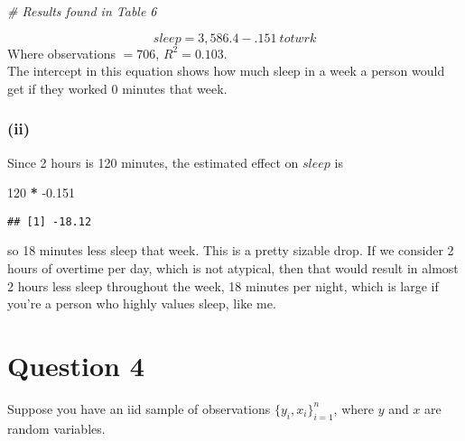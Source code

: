 \documentclass[
]{article}
\newenvironment{Shaded}{\begin{snugshade}}{\end{snugshade}}
\newcommand{\CommentTok}[1]{\textcolor[rgb]{0.56,0.35,0.01}{\textit{#1}}}
\newcommand{\DecValTok}[1]{\textcolor[rgb]{0.00,0.00,0.81}{#1}}
\newcommand{\FloatTok}[1]{\textcolor[rgb]{0.00,0.00,0.81}{#1}}
\newcommand{\OperatorTok}[1]{\textcolor[rgb]{0.81,0.36,0.00}{\textbf{#1}}}
\newcommand{\StringTok}[1]{\textcolor[rgb]{0.31,0.60,0.02}{#1}}
\begin{document}
\begin{Shaded}
\begin{Highlighting}[]
\CommentTok{# Results found in Table 6}
\end{Highlighting}
\end{Shaded}

\[ sleep = 3,586.4 - .151 \:totwrk\] Where observations \(= 706\),
\(R^2 = 0.103\).\\
The intercept in this equation shows how much sleep in a week a person
would get if they worked 0 minutes that week.

\hypertarget{ii-4}{%
\subsubsection{(ii)}\label{ii-4}}

Since 2 hours is 120 minutes, the estimated effect on \(sleep\) is

\begin{Shaded}
\begin{Highlighting}[]
\DecValTok{120} \OperatorTok{*}\StringTok{ }\FloatTok{-0.151}
\end{Highlighting}
\end{Shaded}

\begin{verbatim}
## [1] -18.12
\end{verbatim}

so 18 minutes less sleep that week. This is a pretty sizable drop. If we
consider 2 hours of overtime per day, which is not atypical, then that
would result in almost 2 hours less sleep throughout the week, 18
minutes per night, which is large if you're a person who highly values
sleep, like me.

\hypertarget{question-4}{%
\section{Question 4}\label{question-4}}

Suppose you have an iid sample of observations \(\{y_i, x_i\}^n_{i=1}\),
where \(y\) and \(x\) are random variables.
\end{document}
